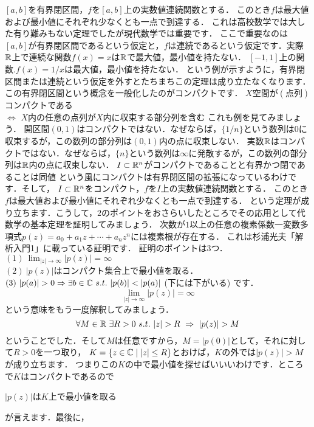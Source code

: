 \thm[最大値最小値の定理]
$[a,b]$を有界閉区間，$f$を$[a,b]$上の実数値連続関数とする．
このとき$f$は最大値および最小値にそれぞれ少なくとも一点で到達する．
\thmx
これは高校数学では大した有り難みもない定理でしたが現代数学では重要です．
ここで重要なのは$[a,b]$が有界閉区間であるという仮定と，$f$は連続であるという仮定です．実際
\ex[非有界]
$\mathbb R$上で連続な関数$f(x)=x$は$\mathbb R$で最大値，最小値を持たない．
\exx
\ex[不連続]
$[-1,1]$上の関数.$f(x)=1/x$は最大値，最小値を持たない．
\exx
という例が示すように，有界閉区間または連続という仮定を外すとたちまちこの定理は成り立たなくなります．
この有界閉区間という概念を一般化したのがコンパクトです．
$X$空間が$(点列)$コンパクトである\\
$\iff$
$X$内の任意の点列が$X$内に収束する部分列を含む
これも例を見てみましょう．
\ex
開区間$(0,1)$はコンパクトではない．なぜならば，$\{1/n\}$という数列は$0$に収束するが，この数列の部分列は$(0,1)$内の点に収束しない．
\exx
\ex
実数$\mathbb R$はコンパクトではない．なぜならば，$\{n\}$という数列は$\infty$に発散するが，この数列の部分列は$\mathbb R$内の点に収束しない．
\exx
\thm
$I \subset \mathbb R^n$がコンパクトであることと有界かつ閉であることは同値
\thmx
という風にコンパクトは有界閉区間の拡張になっているわけです．そして，
\thm
$I \subset \mathbb R^n$をコンパクト，$f$を$I$上の実数値連続関数とする．
このとき$f$は最大値および最小値にそれぞれ少なくとも一点で到達する．
\thmx
という定理が成り立ちます．こうして，$2$のポイントをおさらいしたところでその応用として代数学の基本定理を証明してみましょう．
\thm[代数学の基本定理]
次数が$1$以上の任意の複素係数一変数多項式$p(z)=a_0+a_1 z+\cdots + a_nz^n$には複素根が存在する．
\thmx
\proof[初等解析による証明]
これは杉浦光夫「解析入門1」に載っている証明です．
証明のポイントは3つ．\\
$(1)\ \lim_{|z|\to\infty}|p(z)| = \infty$\\
$(2)\ |p(z)|$はコンパクト集合上で最小値を取る．\\
$(3)\ |p(a)|>0 \Rightarrow \exists b \in \C \ s.t. \ |p(b)| < |p(a)|$ (下には下がいる)
です．
\[
\lim_{|z|\to\infty}|p(z)| = \infty
\]
という意味をもう一度解釈してみましょう．
\[
\forall M \in \R \ \exists R>0 \ s.t. \  |z| > R \ \Rightarrow\  |p(z)|>M
\]
ということでした．そして$M$は任意ですから，$M=|p(0)|$として，それに対して$R>0$を一つ取り，
$K=\{ z\in\mathbb C \mid |z|\le R\}$とおけば，$K$の外では$|p(z)|>M$が成り立ちます．
つまりこの$K$の中で最小値を探せばいいいわけです．ところで$K$はコンパクトであるので
\begin{center}
$|p(z)|$は$K$上で最小値を取る
\end{center}
が言えます．最後に，
